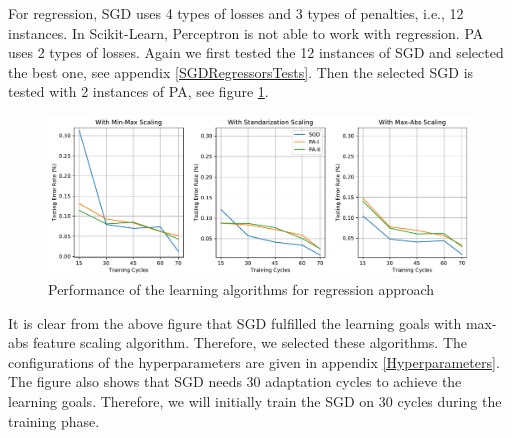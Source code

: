 \documentclass[a4paper,12pt]{article}
\begin{document}
For regression, SGD uses 4 types of losses and 3 types of penalties, i.e., 12 instances. In Scikit-Learn, Perceptron is not able to work with regression. PA uses 2 types of losses. Again we first tested the 12 instances of SGD and selected the best one, see appendix \ref{SGDRegressorsTests}. Then the selected SGD is tested with 2 instances of PA, see figure \ref{Regressors}. 
\begin{figure}[H]
	\centering
	\includegraphics[keepaspectratio, width=\linewidth]{graphs/RegressionModelSelection.pdf}
	\caption{Performance of the learning algorithms for regression approach}
	\label{Regressors}
\end{figure}
It is clear from the above figure that SGD fulfilled the learning goals with max-abs feature scaling algorithm. Therefore, we selected these algorithms. The configurations of the hyperparameters are given in appendix \ref{Hyperparameters}. The figure also shows that SGD needs 30 adaptation cycles to achieve the learning goals. Therefore, we will initially train the SGD on 30 cycles during the training phase.
\end{document}
